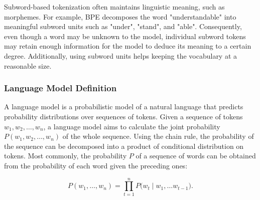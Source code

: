 
Subword-based tokenization often maintains linguistic meaning, such as morphemes. For example, \ac{BPE} decomposes the word "understandable" into meaningful subword units such as "under", "stand", and "able". Consequently, even though a word may be unknown to the model, individual subword tokens may retain enough information for the model to deduce its meaning to a certain degree. Additionally, using subword units helps keeping the vocabulary at a reasonable size.


\subsubsection{Language Model Definition}


A language model is a probabilistic model of a natural language that predicts probability distributions over sequences of tokens. Given a sequence of tokens $w_1, w_2, \ldots, w_n$, a language model aims to calculate the joint probability $P(w_1, w_2, \ldots, w_n)$ of the whole sequence. Using the chain rule, the probability of the sequence can be decomposed into a product of conditional distribution on tokens. Most commonly, the probability $P$ of a sequence of words can be obtained from the probability of each word given the preceding ones:

\begin{equation}
    P(w_1, \ldots, w_n) = \prod_{t=1}^{n} P\bigl(w_t \mid w_1, \ldots w_{t-1}\bigr).
\label{equation:causal-distribution}
\end{equation}


